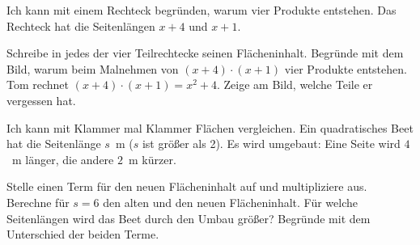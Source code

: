 \begin{aufgabe}{Ich kann mit einem Rechteck begründen, warum vier Produkte entstehen. Das Rechteck hat die Seitenlängen $x + 4$ und $x + 1$.}


\begin{teile}
\teil Schreibe in jedes der vier Teilrechtecke seinen Flächeninhalt.
\teil Begründe mit dem Bild, warum beim Malnehmen von $(x + 4) \cdot (x + 1)$ vier Produkte entstehen.
\teil Tom rechnet $(x + 4) \cdot (x + 1) = x^2 + 4$. Zeige am Bild, welche Teile er vergessen hat.
\end{teile}
\end{aufgabe}

\begin{aufgabe}{Ich kann mit Klammer mal Klammer Flächen vergleichen. Ein quadratisches Beet hat die Seitenlänge $s$~m ($s$ ist größer als 2). Es wird umgebaut: Eine Seite wird $4$~m länger, die andere $2$~m kürzer.}
\begin{teile}
\teil Stelle einen Term für den neuen Flächeninhalt auf und multipliziere aus.
\teil Berechne für $s = 6$ den alten und den neuen Flächeninhalt.
\teil Für welche Seitenlängen wird das Beet durch den Umbau größer? Begründe mit dem Unterschied der beiden Terme.
\end{teile}
\end{aufgabe}
